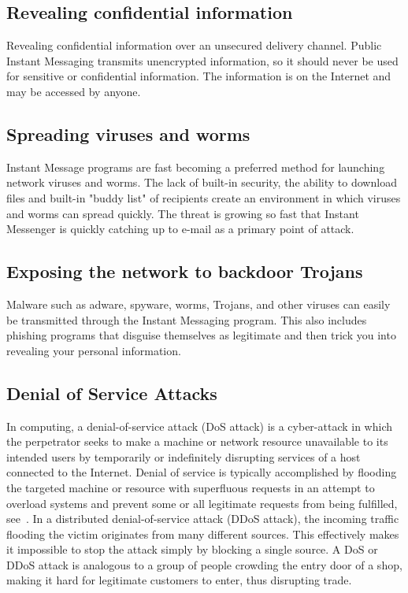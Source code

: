 \subsection{Revealing confidential information}\label{subsec:revealing-confidential-information}
Revealing confidential information over an unsecured delivery channel.
Public Instant Messaging transmits unencrypted information, so it should never be used for sensitive or confidential
information.
The information is on the Internet and may be accessed by anyone.

\subsection{Spreading viruses and worms}\label{subsec:spreading-viruses-and-worms}
Instant Message programs are fast becoming a preferred method for launching network viruses and worms.
The lack of built-in security, the ability to download files and built-in "buddy list" of recipients create an
environment in which viruses and worms can spread quickly.
The threat is growing so fast that Instant Messenger is quickly catching up to e-mail as a primary point of attack.

\subsection{Exposing the network to backdoor Trojans}\label{subsec:exposing-the-network-to-backdoor-trojans}
Malware such as adware, spyware, worms, Trojans, and other viruses can easily be transmitted through the Instant Messaging program.
This also includes phishing programs that disguise themselves as legitimate and then trick you into revealing your personal information.

\subsection{Denial of Service Attacks}\label{subsec:denial-of-service-attacks}
In computing, a denial-of-service attack (DoS attack) is a cyber-attack in which the perpetrator seeks to make a machine or
network resource unavailable to its intended users by temporarily or indefinitely disrupting services of a host connected
to the Internet.
Denial of service is typically accomplished by flooding the targeted machine or resource with superfluous requests in
an attempt to overload systems and prevent some or all legitimate requests from being fulfilled, see~\cite{gu2007denial}.
In a distributed denial-of-service attack (DDoS attack), the incoming traffic flooding the victim originates from
many different sources.
This effectively makes it impossible to stop the attack simply by blocking a single source.
A DoS or DDoS attack is analogous to a group of people crowding the entry door of a shop, making it hard for legitimate
customers to enter, thus disrupting trade.

